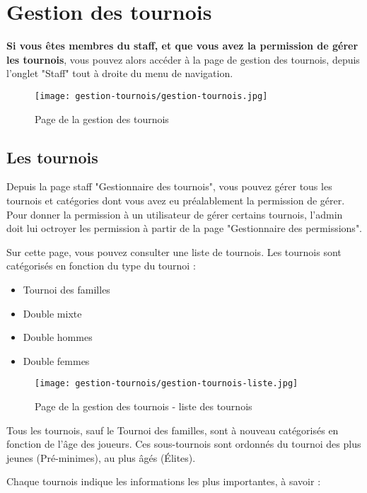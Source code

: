 \section{Gestion des tournois}

\textbf{Si vous êtes membres du staff, et que vous avez la permission de gérer les tournois}, vous pouvez alors accéder à la page de gestion des tournois, depuis l'onglet "Staff" tout à droite du menu de navigation.

\begin{figure}[H]
\centering
\texttt{[image: gestion-tournois/gestion-tournois.jpg]}
\caption{Page de la gestion des tournois}
\end{figure}

\subsection{Les tournois}

Depuis la page staff "Gestionnaire des tournois", vous pouvez gérer tous les tournois et catégories dont vous avez eu préalablement la permission de gérer. Pour donner la permission à un utilisateur de gérer certains tournois, l'admin doit lui octroyer les permission à partir de la page "Gestionnaire des permissions".

Sur cette page, vous pouvez consulter une liste de tournois. Les tournois sont catégorisés en fonction du type du tournoi :

\begin{itemize}
\item Tournoi des familles
\item Double mixte
\item Double hommes
\item Double femmes
\end{itemize}

\begin{figure}[H]
\centering
\texttt{[image: gestion-tournois/gestion-tournois-liste.jpg]}
\caption{Page de la gestion des tournois - liste des tournois}
\end{figure}

Tous les tournois, sauf le Tournoi des familles, sont à nouveau catégorisés en fonction de l'âge des joueurs. Ces sous-tournois sont ordonnés du tournoi des plus jeunes (Pré-minimes), au plus âgés (Élites).\newline

Chaque tournois indique les informations les plus importantes, à savoir :

